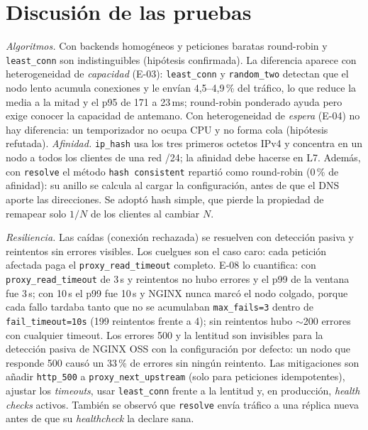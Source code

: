 \documentclass[conference]{IEEEtran}
\begin{document}
\section{Discusión de las pruebas}\label{sec:discusion}
\emph{Algoritmos.} Con backends homogéneos y peticiones baratas round-robin y \texttt{least\_conn} son indistinguibles (hipótesis confirmada). La diferencia aparece con heterogeneidad de \emph{capacidad} (E-03): \texttt{least\_conn} y \texttt{random\_two} detectan que el nodo lento acumula conexiones y le envían 4,5--4,9\,\% del tráfico, lo que reduce la media a la mitad y el p95 de 171 a 23\,ms; round-robin ponderado ayuda pero exige conocer la capacidad de antemano. Con heterogeneidad de \emph{espera} (E-04) no hay diferencia: un temporizador no ocupa CPU y no forma cola (hipótesis refutada). \emph{Afinidad.} \texttt{ip\_hash} usa los tres primeros octetos IPv4 y concentra en un nodo a todos los clientes de una red /24; la afinidad debe hacerse en L7. Además, con \texttt{resolve} el método \texttt{hash~consistent} repartió como round-robin (0\,\% de afinidad): su anillo se calcula al cargar la configuración, antes de que el DNS aporte las direcciones. Se adoptó hash simple, que pierde la propiedad de remapear solo $1/N$ de los clientes al cambiar $N$.

\emph{Resiliencia.} Las caídas (conexión rechazada) se resuelven con detección pasiva y reintentos sin errores visibles. Los cuelgues son el caso caro: cada petición afectada paga el \texttt{proxy\_read\_timeout} completo. E-08 lo cuantifica: con \texttt{proxy\_read\_timeout} de 3\,s y reintentos no hubo errores y el p99 de la ventana fue 3\,s; con 10\,s el p99 fue 10\,s y NGINX nunca marcó el nodo colgado, porque cada fallo tardaba tanto que no se acumulaban \texttt{max\_fails=3} dentro de \texttt{fail\_timeout=10s} (199 reintentos frente a 4); sin reintentos hubo $\sim$200 errores con cualquier timeout. Los errores 500 y la lentitud son invisibles para la detección pasiva de NGINX OSS con la configuración por defecto: un nodo que responde 500 causó un 33\,\% de errores sin ningún reintento. Las mitigaciones son añadir \texttt{http\_500} a \texttt{proxy\_next\_upstream} (solo para peticiones idempotentes), ajustar los \emph{timeouts}, usar \texttt{least\_conn} frente a la lentitud y, en producción, \emph{health checks} activos. También se observó que \texttt{resolve} envía tráfico a una réplica nueva antes de que su \emph{healthcheck} la declare sana.
\end{document}
